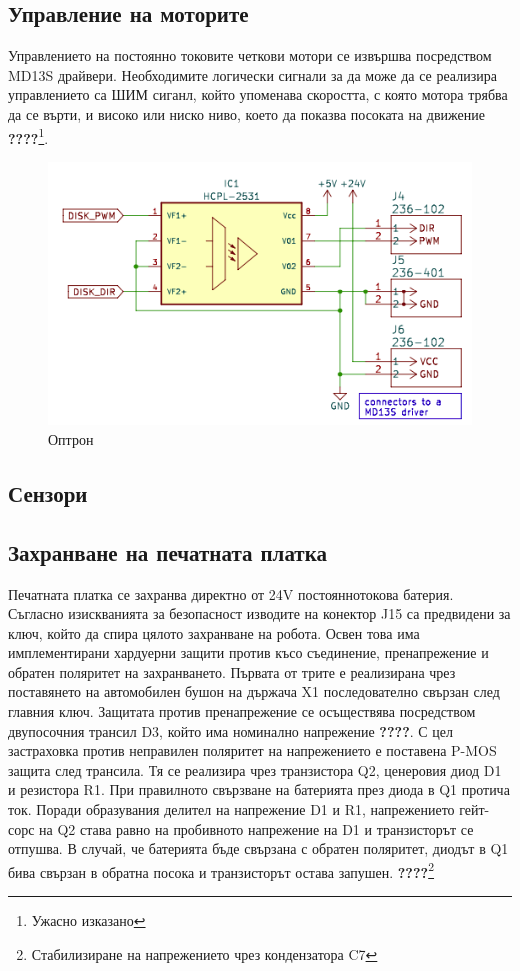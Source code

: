 \subsection{Управление на моторите}

Управлението на постоянно токовите четкови мотори се извършва посредством MD13S драйвери. Необходимите логически сигнали за да може да се реализира управлението са ШИМ сиганл, който упоменава скоростта, с която мотора трябва да се върти, и високо или ниско ниво, което да показва посоката на движение
\textbf{????}\footnote{Ужасно изказано}.

\begin{figure}[H]
    \centering
    \includegraphics[width=0.6\linewidth]{images/optron.png}
    
    \caption{Оптрон}
    \label{fig:optron} 
\end{figure}



\subsection{Сензори}



\subsection{Захранване на печатната платка}

Печатната платка се захранва директно от 24V постояннотокова батерия. Съгласно изискванията за безопасност изводите на конектор J15 са предвидени за ключ, който да спира цялото захранване на робота. Освен това има имплементирани хардуерни защити против късо съединение, пренапрежение и обратен поляритет на захранването. Първата от трите е реализирана чрез поставянето на автомобилен бушон на държача X1 последователно свързан след главния ключ. Защитата против пренапрежение се осъществява посредством двупосочния трансил D3, който има номинално напрежение \textbf{????}. С цел застраховка против неправилен поляритет на напрежението е поставена P-MOS защита след трансила. Тя се реализира чрез транзистора Q2, ценеровия диод D1 и резистора R1. При правилното свързване на батерията през диода в Q1 протича ток. Поради образувания делител на напрежение D1 и R1, напрежението гейт-сорс на Q2 става равно на пробивното напрежение на D1 и транзисторът се отпушва. В случай, че батерията бъде свързана с обратен поляритет, диодът в Q1 бива свързан в обратна посока и транзисторът остава запушен. 
\textbf{????}\footnote{Стабилизиране на напрежението чрез кондензатора C7}

